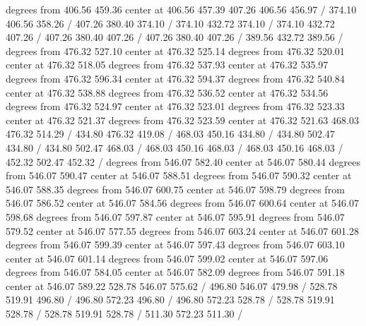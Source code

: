{ degrees from 406.56 459.36 center at 406.56 457.39
\setsolid
{} 407.26 406.56 456.97 /
\setsolid
{} 374.10 406.56 358.26 /
\setsolid
{} 407.26 380.40 374.10 /
 374.10 432.72 374.10 /
 374.10 432.72 407.26 /
 407.26 380.40 407.26 /
 407.26 380.40 407.26 /
\setsolid
{} 389.56 432.72 389.56 /
 degrees from 476.32 527.10 center at 476.32 525.14
 degrees from 476.32 520.01 center at 476.32 518.05
 degrees from 476.32 537.93 center at 476.32 535.97
 degrees from 476.32 596.34 center at 476.32 594.37
 degrees from 476.32 540.84 center at 476.32 538.88
 degrees from 476.32 536.52 center at 476.32 534.56
 degrees from 476.32 524.97 center at 476.32 523.01
 degrees from 476.32 523.33 center at 476.32 521.37
 degrees from 476.32 523.59 center at 476.32 521.63
\setsolid
{} 468.03 476.32 514.29 /
\setsolid
{} 434.80 476.32 419.08 /
\setsolid
{} 468.03 450.16 434.80 /
 434.80 502.47 434.80 /
 434.80 502.47 468.03 /
 468.03 450.16 468.03 /
 468.03 450.16 468.03 /
\setsolid
{} 452.32 502.47 452.32 /
 degrees from 546.07 582.40 center at 546.07 580.44
 degrees from 546.07 590.47 center at 546.07 588.51
 degrees from 546.07 590.32 center at 546.07 588.35
 degrees from 546.07 600.75 center at 546.07 598.79
 degrees from 546.07 586.52 center at 546.07 584.56
 degrees from 546.07 600.64 center at 546.07 598.68
 degrees from 546.07 597.87 center at 546.07 595.91
 degrees from 546.07 579.52 center at 546.07 577.55
 degrees from 546.07 603.24 center at 546.07 601.28
 degrees from 546.07 599.39 center at 546.07 597.43
 degrees from 546.07 603.10 center at 546.07 601.14
 degrees from 546.07 599.02 center at 546.07 597.06
 degrees from 546.07 584.05 center at 546.07 582.09
 degrees from 546.07 591.18 center at 546.07 589.22
\setsolid
{} 528.78 546.07 575.62 /
\setsolid
{} 496.80 546.07 479.98 /
\setsolid
{} 528.78 519.91 496.80 /
 496.80 572.23 496.80 /
 496.80 572.23 528.78 /
 528.78 519.91 528.78 /
 528.78 519.91 528.78 /
\setsolid
{} 511.30 572.23 511.30 /
}
